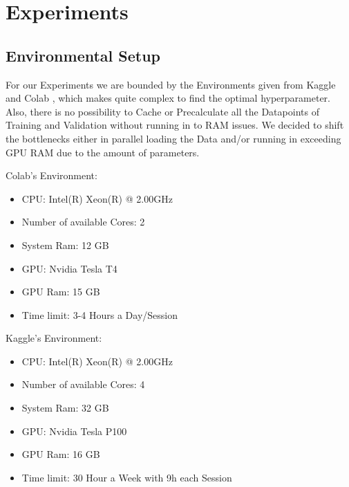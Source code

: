 \section{Experiments}\label{sec:experiments}

\subsection{Environmental Setup}\label{ch:ev}
For our Experiments we are bounded by the Environments given from Kaggle \cite{noauthor_kaggle_nodate} and Colab \cite{noauthor_google_nodate}, 
which makes quite complex to find the optimal hyperparameter. Also, there is no possibility to Cache or Precalculate all the Datapoints of
Training and Validation without running in to RAM issues. We decided to shift the bottlenecks either in parallel loading the
Data and/or running in exceeding GPU RAM due to the amount of parameters.

\vspace{0.3cm}

\begin{minipage}{0.5\textwidth}
    Colab's Environment:
    \begin{itemize}
        \item CPU: Intel(R) Xeon(R) @ 2.00GHz
        \item Number of available Cores: 2
        \item System Ram: 12 GB
        \item GPU: Nvidia Tesla T4
        \item GPU Ram: 15 GB
        \item Time limit: 3-4 Hours a Day/Session
    \end{itemize}
\end{minipage}
\begin{minipage}{0.5\textwidth}
    Kaggle's Environment:
    \begin{itemize}
        \item CPU: Intel(R) Xeon(R) @ 2.00GHz
        \item Number of available Cores: 4
        \item System Ram: 32 GB
        \item GPU: Nvidia Tesla P100
        \item GPU Ram: 16 GB
        \item Time limit: 30 Hour a Week with 9h each Session
    \end{itemize}
\end{minipage}

